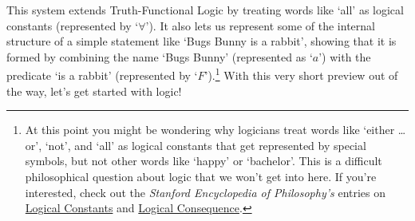 \noindent This system extends Truth-Functional Logic by treating words like `all' as logical constants (represented by `$\forall$').  It also lets us represent some of the internal structure of a simple statement like `Bugs Bunny is a rabbit', showing that it is formed by combining the name `Bugs Bunny' (represented as `$a$') with the predicate `is a rabbit' (represented by `$F$').\footnote{At this point you might be wondering why logicians treat words like `either \ldots or', `not', and `all' as logical constants that get represented by special symbols, but not other words like `happy' or `bachelor'.  This is a difficult philosophical question about logic that we won't get into here.  If you're interested, check out the \emph{Stanford Encyclopedia of Philosophy's} entries on \href{http://plato.stanford.edu/entries/logical-constants/}{Logical Constants} and  \href{http://plato.stanford.edu/entries/logical-consequence/}{Logical Consequence}.} With this very short preview out of the way, let's get started with logic! 




%
%
 